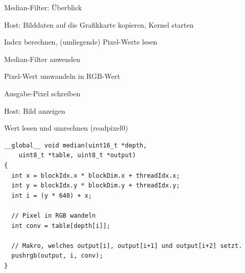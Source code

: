 \documentclass[compress]{beamer}
\begin{document}
%
%

\begin{frame}{Median-Filter: Überblick}
    \begin{list}{.}{\itemsep=1em}
        \item Host: Bilddaten auf die Grafikkarte kopieren, Kernel starten
        \item Index berechnen, (umliegende) Pixel-Werte lesen
        \item Median-Filter anwenden
        \item Pixel-Wert umwandeln in RGB-Wert
        \item Ausgabe-Pixel schreiben
        \item Host: Bild anzeigen
    \end{list}
\end{frame}

\begin{frame}[fragile]{Wert lesen und umrechnen (readpixel0)}
\begin{lstlisting}
__global__ void median(uint16_t *depth,
    uint8_t *table, uint8_t *output)
{
  int x = blockIdx.x * blockDim.x + threadIdx.x;
  int y = blockIdx.y * blockDim.y + threadIdx.y;
  int i = (y * 640) + x;

  // Pixel in RGB wandeln
  int conv = table[depth[i]];

  // Makro, welches output[i], output[i+1] und output[i+2] setzt.
  pushrgb(output, i, conv);
}
\end{lstlisting}
\end{frame}
\end{document}
